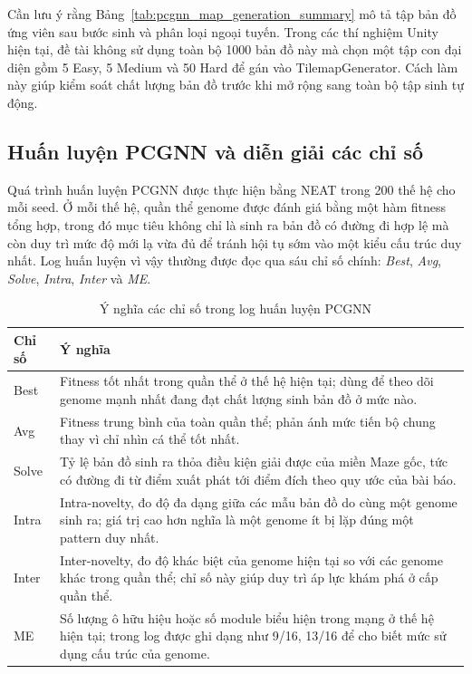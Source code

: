 Cần lưu ý rằng Bảng~\ref{tab:pcgnn_map_generation_summary} mô tả tập bản đồ ứng viên sau bước sinh và phân loại ngoại tuyến. Trong các thí nghiệm Unity hiện tại, đề tài không sử dụng toàn bộ 1000 bản đồ này mà chọn một tập con đại diện gồm 5 Easy, 5 Medium và 50 Hard để gán vào TilemapGenerator. Cách làm này giúp kiểm soát chất lượng bản đồ trước khi mở rộng sang toàn bộ tập sinh tự động.

\subsection{Huấn luyện PCGNN và diễn giải các chỉ số}

Quá trình huấn luyện PCGNN được thực hiện bằng NEAT trong 200 thế hệ cho mỗi seed. Ở mỗi thế hệ, quần thể genome được đánh giá bằng một hàm fitness tổng hợp, trong đó mục tiêu không chỉ là sinh ra bản đồ có đường đi hợp lệ mà còn duy trì mức độ mới lạ vừa đủ để tránh hội tụ sớm vào một kiểu cấu trúc duy nhất. Log huấn luyện vì vậy thường được đọc qua sáu chỉ số chính: \textit{Best}, \textit{Avg}, \textit{Solve}, \textit{Intra}, \textit{Inter} và \textit{ME}.

\begin{table}[H]
    \centering
    \small
    \caption{Ý nghĩa các chỉ số trong log huấn luyện PCGNN}
    \label{tab:pcgnn_training_metrics}
    \begin{tabular}{|p{2.2cm}|p{10.6cm}|}
        \hline
        \textbf{Chỉ số} & \textbf{Ý nghĩa} \\
        \hline
        Best & Fitness tốt nhất trong quần thể ở thế hệ hiện tại; dùng để theo dõi genome mạnh nhất đang đạt chất lượng sinh bản đồ ở mức nào. \\
        \hline
        Avg & Fitness trung bình của toàn quần thể; phản ánh mức tiến bộ chung thay vì chỉ nhìn cá thể tốt nhất. \\
        \hline
        Solve & Tỷ lệ bản đồ sinh ra thỏa điều kiện giải được của miền Maze gốc, tức có đường đi từ điểm xuất phát tới điểm đích theo quy ước của bài báo. \\
        \hline
        Intra & Intra-novelty, đo độ đa dạng giữa các mẫu bản đồ do cùng một genome sinh ra; giá trị cao hơn nghĩa là một genome ít bị lặp đúng một pattern duy nhất. \\
        \hline
        Inter & Inter-novelty, đo độ khác biệt của genome hiện tại so với các genome khác trong quần thể; chỉ số này giúp duy trì áp lực khám phá ở cấp quần thể. \\
        \hline
        ME & Số lượng ô hữu hiệu hoặc số module biểu hiện trong mạng ở thế hệ hiện tại; trong log được ghi dạng như 9/16, 13/16 để cho biết mức sử dụng cấu trúc của genome. \\
        \hline
    \end{tabular}
\end{table}

